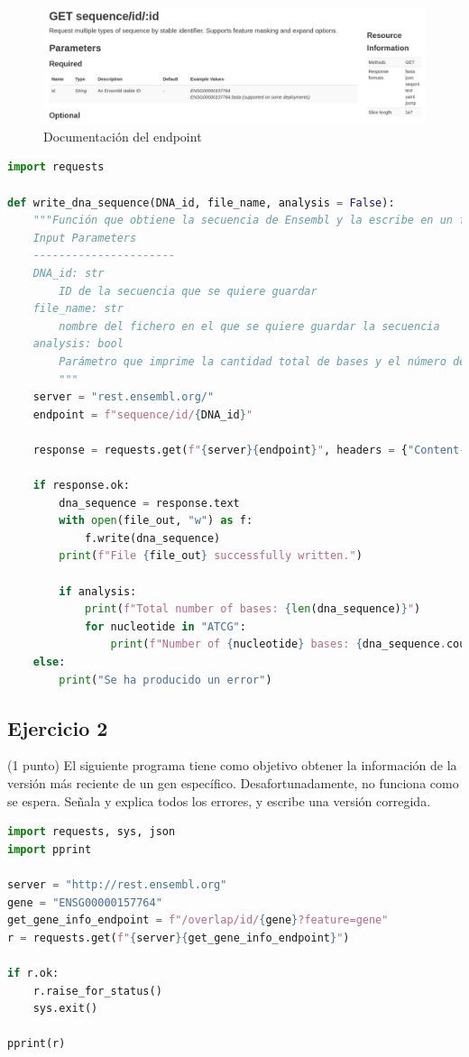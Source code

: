 \begin{figure}[htbp]
\centering
\includegraphics[width = \textwidth]{figs/endpoint-examen.png}
\caption{Documentación del endpoint}
\end{figure}

\begin{lstlisting}[language=Python]
import requests

def write_dna_sequence(DNA_id, file_name, analysis = False):
	"""Función que obtiene la secuencia de Ensembl y la escribe en un fichero.
	Input Parameters
	----------------------
	DNA_id: str
		ID de la secuencia que se quiere guardar
	file_name: str
		nombre del fichero en el que se quiere guardar la secuencia
	analysis: bool
		Parámetro que imprime la cantidad total de bases y el número de bases de cada nucleótido cuando True (por defecto).
		"""
	server = "rest.ensembl.org/"
	endpoint = f"sequence/id/{DNA_id}"
	
	response = requests.get(f"{server}{endpoint}", headers = {"Content-type":"application/text"})
	
	if response.ok:
		dna_sequence = response.text
		with open(file_out, "w") as f:
			f.write(dna_sequence)
		print(f"File {file_out} successfully written.")
		
		if analysis:
			print(f"Total number of bases: {len(dna_sequence)}")
			for nucleotide in "ATCG":
				print(f"Number of {nucleotide} bases: {dna_sequence.count(nucleotide)}")
	else:
		print("Se ha producido un error")
\end{lstlisting}

\subsection{Ejercicio 2}
(1 punto) El siguiente programa tiene como objetivo obtener la información de la versión más reciente de un gen específico. Desafortunadamente, no funciona como se espera. Señala y explica todos los errores, y escribe una versión corregida.
\begin{lstlisting}[language=Python]
import requests, sys, json
import pprint

server = "http://rest.ensembl.org"
gene = "ENSG00000157764"
get_gene_info_endpoint = f"/overlap/id/{gene}?feature=gene"
r = requests.get(f"{server}{get_gene_info_endpoint}")

if r.ok:
	r.raise_for_status()
	sys.exit()

pprint(r) 
\end{lstlisting}

